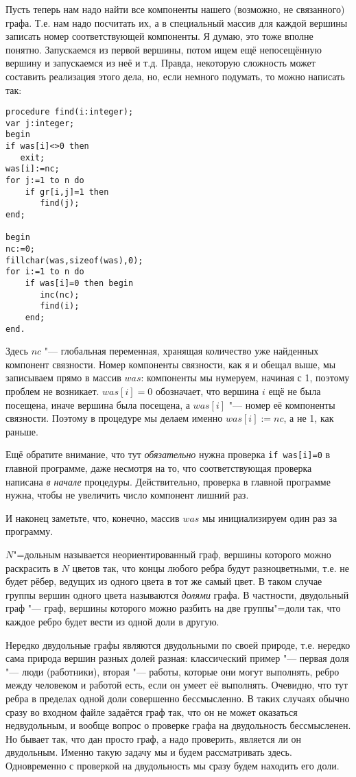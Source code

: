 Пусть теперь нам надо найти все компоненты нашего (возможно, не связанного) графа. Т.е. нам надо посчитать их, а в
специальный массив для каждой вершины записать номер соответствующей компоненты. Я думаю, это тоже вполне понятно.
Запускаемся из первой вершины, потом ищем ещё непосещённую вершину и запускаемся из неё и т.д. Правда, некоторую сложность
может составить реализация этого дела, но, если немного подумать, то можно написать так:
\begin{codesample}\begin{verbatim}
procedure find(i:integer);
var j:integer;
begin
if was[i]<>0 then
   exit;
was[i]:=nc;
for j:=1 to n do
    if gr[i,j]=1 then
       find(j);
end;

begin
nc:=0;
fillchar(was,sizeof(was),0);
for i:=1 to n do
    if was[i]=0 then begin
       inc(nc);
       find(i);
    end;
end.
\end{verbatim}\end{codesample}

Здесь $nc$ "--- глобальная переменная, хранящая количество уже найденных компонент связности. Номер компоненты связности,
как я и обещал выше, мы записываем прямо в массив $was$: компоненты мы нумеруем, начиная с 1, поэтому проблем не возникает.
$was[i]=0$ обозначает, что вершина $i$ ещё не была посещена, иначе вершина была посещена, а $was[i]$ "--- номер
её компоненты связности. Поэтому в процедуре мы делаем именно $was[i]:=nc$, а не 1, как раньше.

Ещё обратите внимание, что тут \textit{обязательно} нужна проверка \texttt{if was[i]=0} в главной программе, даже
несмотря на то, что соответствующая проверка написана \textit{в начале} процедуры. Действительно, проверка в главной
программе нужна, чтобы не увеличить число компонент лишний раз.

И наконец заметьте, что, конечно, массив $was$ мы инициализируем один раз за программу.

$N$"=дольным называется неориентированный граф, вершины которого можно раскрасить в $N$ цветов так, что концы любого 
ребра будут разноцветными, т.е. не будет рёбер, ведущих из одного цвета в тот же самый цвет. В 
таком случае группы вершин одного цвета называются \textit{долями} графа. В частности, двудольный 
граф "--- граф, вершины которого можно разбить на две группы"=доли так, что каждое ребро будет 
вести из одной доли в другую.

Нередко двудольные графы являются двудольными по 
своей природе, т.е. нередко сама природа вершин разных долей разная: классический пример "--- 
первая доля "--- люди (работники), вторая "--- работы, которые они могут выполнять, ребро между 
человеком и работой есть, если он умеет её выполнять. Очевидно, что тут ребра в пределах одной доли 
совершенно бессмысленно. В таких случаях обычно сразу во входном файле задаётся граф так, что он не 
может оказаться недвудольным, и вообще вопрос о проверке графа на двудольность бессмысленен. Но 
бывает так, что дан просто граф, а надо проверить, является ли он двудольным. Именно такую задачу мы 
и будем рассматривать здесь. Одновременно с проверкой на двудольность мы сразу будем находить его 
доли. 

